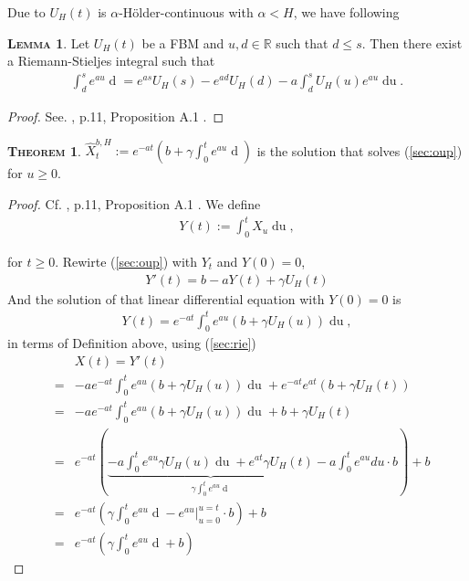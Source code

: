 \documentclass[a4paper, twoside, 11pt]{article}
\theoremstyle{definition}
\newtheorem{theorem}[definition]{\scshape Theorem}
\newtheorem{lemma}[definition]{\scshape Lemma}
\newcommand{\brkt}[1]{\left({#1} \right)}
\begin{document}
Due to $U_H(t)$ is $\alpha$-H\"older-continuous with $\alpha < H$, we have following
\begin{lemma}
  Let $U_H(t)$ be a FBM and $u, d\in \mathbb{R}$ such that $d\le s$. Then there exist a Riemann-Stieljes integral such that 
  \begin{eqnarray}
	\int_d^s e^{au} \mathop{dU_H(u)} = e^{as} U_H(s) - e^{ad} U_H(d) - a\int_d^s U_H(u) e^{au}\mathop{du}.
	\label{sec:rie}
  \end{eqnarray}
\end{lemma}

\begin{proof}
  See. \cite{chriel}, p.11, Proposition A.1 .
\end{proof}

\begin{theorem}
  $\hat{X}^{b,H}_t := e^{-at} \brkt{b + \gamma\int_0^t e^{au}\mathop{dU_H(u)}}$ is the solution that solves (\ref{sec:oup}) for $u\ge 0$.
  \label{sec:sol}
\end{theorem}

\begin{proof}
  Cf. \cite{chriel}, p.11, Proposition A.1 . We define
  \begin{eqnarray*}
	Y(t):=\int_0^t X_u \mathop{du},
  \end{eqnarray*}
 
 for $t\ge 0$. Rewirte (\ref{sec:oup}) with $Y_t$ and $Y(0)=0$,
  \begin{eqnarray*}
	Y'(t) = b - aY(t) + \gamma U_H(t)
  \end{eqnarray*}
  And the solution of that linear differential equation with $Y(0)=0$ is
  \begin{eqnarray*}
	Y(t) = e^{-at}\int_0^t e^{au}(b+\gamma U_H(u)) \mathop{du},
  \end{eqnarray*}
  in terms of Definition above, using (\ref{sec:rie})
	\begin{eqnarray*}
	&&X(t) =  Y'(t)\\
	&=& -ae^{-at}\int_0^t e^{au}(b+\gamma U_H(u)) \mathop{du} + e^{-at}e^{at}(b+\gamma U_H(t)) \\
	&=&  -ae^{-at}\int_0^t e^{au}(b+\gamma U_H(u)) \mathop{du} + b +\gamma U_H(t)\\
	&=& e^{-at} \brkt{\underbrace{-a\int_0^t e^{au} \gamma U_H(u) \mathop{du} + e^{at}\gamma U_H(t)}_{\gamma\int_0^t e^{au} \mathop{dU_H(u)}} -a\int_0^t e^{au} du \cdot b } + b\\
  &=&  e^{-at} \brkt{\gamma\int_0^t e^{au} \mathop{dU_H(u)} - e^{au}|^{u=t}_{u=0} \cdot b } + b\\
  &=&  e^{-at} \brkt{\gamma\int_0^t e^{au} \mathop{dU_H(u)} + b}
	\end{eqnarray*}
\end{proof}
\end{document}
